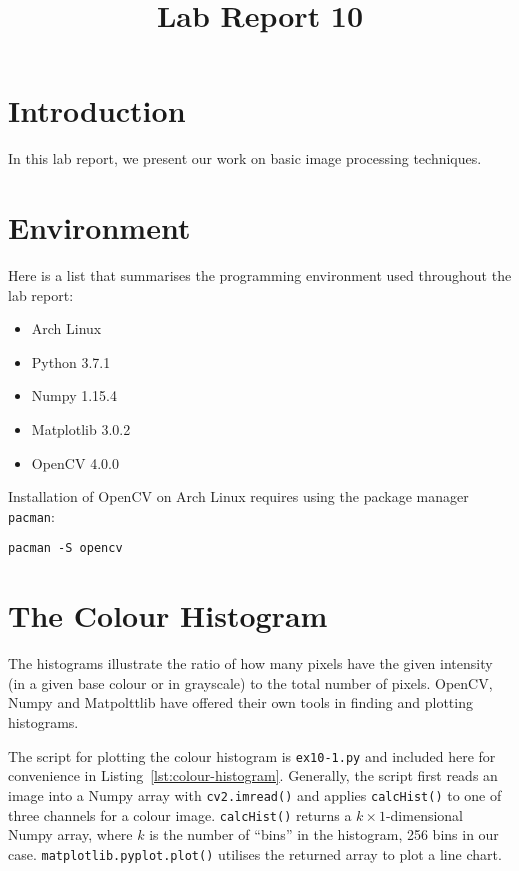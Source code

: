 \documentclass{ee208report}
\title{Lab Report 10}
\begin{document}
\begin{CJK}{UTF8}{gbsn}
    \maketitle
\end{CJK}

\begin{multicols*}{2}

\section{Introduction}

In this lab report, we present our work on basic image processing techniques.

\section{Environment}

Here is a list that summarises the programming environment used throughout the lab report:

\begin{itemize}
    \item Arch Linux
    \item Python 3.7.1
    \item Numpy 1.15.4
    \item Matplotlib 3.0.2
    \item OpenCV 4.0.0
\end{itemize}

Installation of OpenCV on Arch Linux requires using the package manager \texttt{pacman}:

\begin{verbatim}
pacman -S opencv
\end{verbatim}

\section{The Colour Histogram}

The histograms illustrate the ratio of how many pixels have the given intensity (in a given base colour or in grayscale) to the total number of pixels. OpenCV, Numpy and Matpolttlib have offered their own tools in finding and plotting histograms.

The script for plotting the colour histogram is \texttt{ex10-1.py} and included here for convenience in Listing~\ref{lst:colour-histogram}. Generally, the script first reads an image into a Numpy array with \texttt{cv2.imread()} and applies \texttt{calcHist()} to one of three channels for a colour image. \texttt{calcHist()} returns a $k \times 1$-dimensional Numpy array, where $k$ is the number of ``bins'' in the histogram, 256 bins in our case. \texttt{matplotlib.pyplot.plot()} utilises the returned array to plot a line chart.
   

\end{multicols*}
\end{document}

